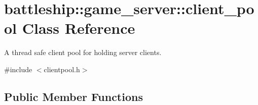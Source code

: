 \hypertarget{classbattleship_1_1game__server_1_1client__pool}{}\section{battleship\+:\+:game\+\_\+server\+:\+:client\+\_\+pool Class Reference}
\label{classbattleship_1_1game__server_1_1client__pool}


A thread safe client pool for holding server clients.  




{\ttfamily \#include $<$clientpool.\+h$>$}

\subsection*{Public Member Functions}
